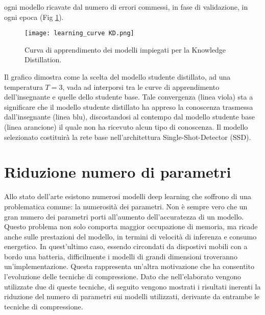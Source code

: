 ogni modello ricavate dal numero di errori commessi, in fase di validazione, 
in ogni epoca (Fig \ref{lc_KD}).
\begin{figure}
    \centering
    \texttt{[image: learning\_curve KD.png]}
    \centering
    \caption{Curva di apprendimento dei modelli impiegati per la Knowledge Distillation.}
    \label{lc_KD}
\end{figure}
Il grafico dimostra come la scelta del modello 
studente distillato, ad una temperatura $T=3$, vada ad interporsi tra le 
curve di apprendimento dell'insegnante e quelle dello studente base. Tale 
convergenza (linea viola) sta a significare che il modello studente distillato 
ha appreso la conoscenza trasmessa dall'insegnante (linea blu), discostandosi 
al contempo dal modello studente base (linea arancione) il quale non ha 
ricevuto alcun tipo di conoscenza. Il modello selezionato costituirà la rete 
base nell'architettura Single-Shot-Detector (SSD). 

\section{Riduzione numero di parametri}
Allo stato dell'arte esistono numerosi modelli deep learning che soffrono 
di una problematica comune: la numerosità dei parametri. Non è sempre 
vero che un gran numero dei parametri porti all'aumento dell'accuratezza 
di un modello. Questo problema non solo comporta maggior occupazione di 
memoria, ma ricade anche sulle prestazioni del modello, in termini di velocità 
di inferenza e consumo energetico. In quest'ultimo caso, essendo circondati 
da dispostivi mobili con a bordo una batteria, difficilmente i modelli di grandi 
dimensioni troveranno un'implementazione. Questa rappresenta un'altra 
motivazione che ha consentito l'evoluzione delle tecniche di compressione. 
Dato che nell'elaborato vengono utilizzate due di queste tecniche, di seguito 
vengono mostrati i risultati inerenti la riduzione del numero di parametri 
sui modelli utilizzati, derivante da entrambe le tecniche di compressione.

